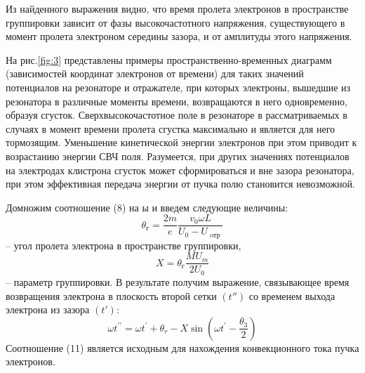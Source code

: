 \documentclass[a4paper,14pt]{extarticle}
\begin{document}
Из найденного выражения видно, что время пролета электронов в пространстве группировки зависит от фазы высокочастотного напряжения, существующего в момент пролета электроном середины зазора, и от амплитуды этого напряжения.

На рис.\ref{fig:3} представлены примеры пространственно-временных диаграмм (зависимостей координат электронов от времени) для таких значений потенциалов на резонаторе и отражателе, при которых электроны, вышедшие из резонатора в различные моменты времени, возвращаются в него одновремен­но, образуя сгусток. Сверхвысокочастотное поле в резонаторе в рассматриваемых в случаях в момент времени пролета сгустка максимально и является для него тормозящим. Уменьшение кинетической энергии электронов при этом приводит к возрастанию энергии СВЧ поля. Разумеется, при других значениях потенциалов на электродах клистрона сгусток может сформироваться и вне зазора резонатора, при этом эффективная передача энергии от пучка полю становится невозможной.

Домножим соотношение (8) на ы и введем следующие величины:
\begin{equation}
  \theta _ { \text{г} } = \frac { 2 m } { e } \frac { v _ { 0 } \omega L } { U _ { 0 } - U _ { \text{ oтр } } }
\end{equation} -- угол пролета электрона в пространстве группировки,
\begin{equation}
  X = \theta _ { \text{г} } \frac{M U _ { m } } { 2 U _ { 0 } }
\end{equation} -- параметр группировки. В результате получим выражение, связывающее время возвращения электрона в плоскость второй сетки $(t'' )$ со временем выхода электрона из зазора $(t')$:
\begin{equation}
  \omega t ^ { \prime \prime } = \omega t ^ { \prime } + \theta _ { r } - X \sin \left( \omega t ^ { \prime } - \frac { \theta _ { 3 } } { 2 } \right)
\end{equation}
Соотношение (11) является исходным для нахождения конвекционного тока пучка электронов.
\end{document}
